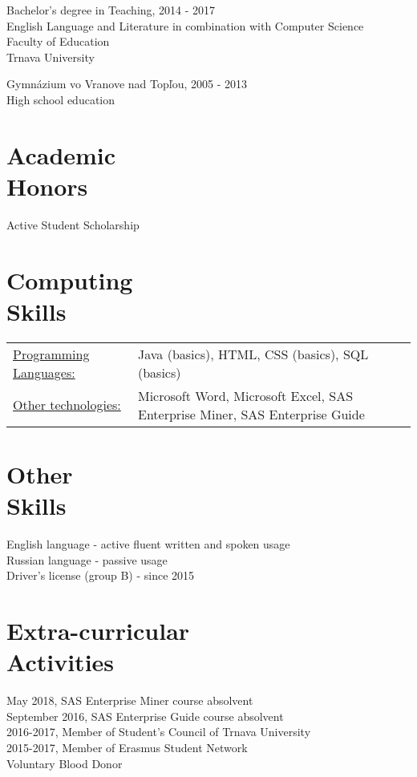 \documentclass[margin]{res}
\begin{document}
\begin{resume}
Bachelor's degree in Teaching, \hfill 2014 - 2017 \\
English Language and Literature in combination with Computer Science \\
Faculty of Education \\
Trnava University

Gymn\'{a}zium vo Vranove nad Top\v{l}ou, \hfill 2005 - 2013 \\
High school education

\section{Academic \\ Honors}
Active Student Scholarship

\section{Computing \\ Skills}
   \begin{tabular}{l p{3in}}
       \underline{Programming Languages:} & Java (basics), HTML, CSS (basics), SQL (basics) \\
       \underline{Other technologies:} & Microsoft Word, Microsoft Excel, SAS Enterprise Miner, SAS Enterprise Guide
 \end{tabular}

\section{Other \\ Skills}
English language - active fluent written and spoken usage \\
Russian language - passive usage \\
Driver's license (group B) - since 2015

\section{Extra-curricular \\ Activities}
May 2018, SAS Enterprise Miner course absolvent \\
September 2016, SAS Enterprise Guide course absolvent \\
2016-2017, Member of Student's Council of Trnava University \\
2015-2017, Member of Erasmus Student Network \\
Voluntary Blood Donor
\end{resume}
\end{document}

